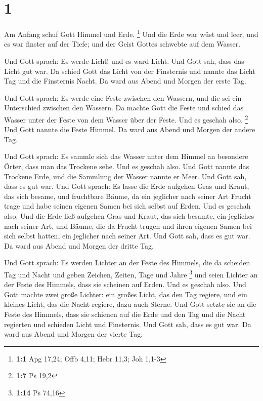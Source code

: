\hypertarget{section}{%
\section{1}\label{section}}

 Am Anfang schuf Gott Himmel und Erde. \footnote{\textbf{1:1}
  Apg 17,24; Offb 4,11; Hebr 11,3; Joh 1,1-3}  Und die Erde
war wüst und leer, und es war finster auf der Tiefe; und der Geist
Gottes schwebte auf dem Wasser.

 Und Gott sprach: Es werde Licht! und es ward Licht.
 Und Gott sah, dass das Licht gut war. Da schied Gott das
Licht von der Finsternis  und nannte das Licht Tag und die
Finsternis Nacht. Da ward aus Abend und Morgen der erste Tag.

 Und Gott sprach: Es werde eine Feste zwischen den Wassern,
und die sei ein Unterschied zwischen den Wassern.  Da machte
Gott die Feste und schied das Wasser unter der Feste von dem Wasser über
der Feste. Und es geschah also. \footnote{\textbf{1:7} Ps 19,2}
 Und Gott nannte die Feste Himmel. Da ward aus Abend und
Morgen der andere Tag.

 Und Gott sprach: Es sammle sich das Wasser unter dem Himmel
an besondere Örter, dass man das Trockene sehe. Und es geschah also.
 Und Gott nannte das Trockene Erde, und die Sammlung der
Wasser nannte er Meer. Und Gott sah, dass es gut war.  Und
Gott sprach: Es lasse die Erde aufgehen Gras und Kraut, das sich besame,
und fruchtbare Bäume, da ein jeglicher nach seiner Art Frucht trage und
habe seinen eigenen Samen bei sich selbst auf Erden. Und es geschah
also.  Und die Erde ließ aufgehen Gras und Kraut, das sich
besamte, ein jegliches nach seiner Art, und Bäume, die da Frucht trugen
und ihren eigenen Samen bei sich selbst hatten, ein jeglicher nach
seiner Art. Und Gott sah, dass es gut war.  Da ward aus
Abend und Morgen der dritte Tag.

 Und Gott sprach: Es werden Lichter an der Feste des
Himmels, die da scheiden Tag und Nacht und geben Zeichen, Zeiten, Tage
und Jahre \footnote{\textbf{1:14} Ps 74,16}  und seien
Lichter an der Feste des Himmels, dass sie scheinen auf Erden. Und es
geschah also.  Und Gott machte zwei große Lichter: ein
großes Licht, das den Tag regiere, und ein kleines Licht, das die Nacht
regiere, dazu auch Sterne.  Und Gott setzte sie an die
Feste des Himmels, dass sie schienen auf die Erde  und den
Tag und die Nacht regierten und schieden Licht und Finsternis. Und Gott
sah, dass es gut war.  Da ward aus Abend und Morgen der
vierte Tag.

